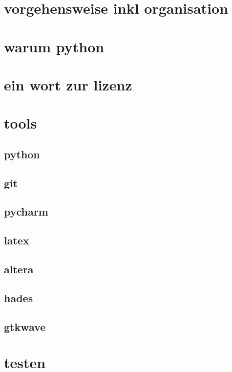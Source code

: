  
\section{vorgehensweise inkl organisation}
\section{warum python} %
\section{ein wort zur lizenz} %
\section{tools}
\subsection{python}
\subsection{git}
\subsection{pycharm}
\subsection{latex}
\subsection{altera}
\subsection{hades}
\subsection{gtkwave}
\section{testen}



